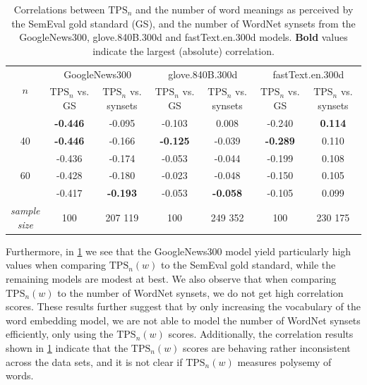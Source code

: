 \begin{table}[H]
    \centering
    \begin{tabular}{ccccccc}
    \toprule
    \multicolumn{1}{c}{\multirow{2}{*}{$n$}} & \multicolumn{2}{c}{GoogleNews300}    & \multicolumn{2}{c}{glove.840B.300d}              & \multicolumn{2}{c}{fastText.en.300d}             \\
    \cmidrule(l){2-7} 
    \multicolumn{1}{c}{}                   & \makecell[tc]{$\text{TPS}_n$ vs.\\GS} & \makecell[tc]{$\text{TPS}_n$ vs.\\synsets} & \makecell[tc]{$\text{TPS}_n$ vs.\\GS} & \makecell[tc]{$\text{TPS}_n$ vs.\\synsets} & \makecell[tc]{$\text{TPS}_n$ vs.\\GS} & \makecell[tc]{$\text{TPS}_n$ vs.\\synsets} \\ \midrule
    \trcolor 10           & \textbf{-0.446}  & -0.095       & -0.103  & 0.008        & -0.240  & \textbf{0.114}        \\
    40           & \textbf{-0.446}  & -0.166       & \textbf{-0.125}  & -0.039       & \textbf{-0.289}  & 0.110        \\
    \trcolor 50           & -0.436  & -0.174       & -0.053  & -0.044       & -0.199  & 0.108        \\
    60           & -0.428  & -0.180       & -0.023  & -0.048       & -0.150  & 0.105        \\
    \trcolor 100          & -0.417  & \textbf{-0.193}       & -0.053  & \textbf{-0.058}       & -0.105  & 0.099        \\
    \midrule
    \makecell[tc]{\textit{sample}\\\textit{size}} & 100 & 207 119 & 100 & 249 352 & 100 & 230 175 \\
    \bottomrule
    \end{tabular}
    \caption{Correlations between $\text{TPS}_n$ and the number of word meanings as perceived by the SemEval gold standard (GS), and the number of WordNet synsets from the GoogleNews300, glove.840B.300d and fastText.en.300d models. \textbf{Bold} values indicate the largest (absolute) correlation.}
    \label{table:tps-n-correlation-external-word-embeddings}
\end{table}
Furthermore, in \cref{table:tps-n-correlation-external-word-embeddings} we see that the GoogleNews300 model yield particularly high values when comparing $\text{TPS}_n(w)$ to the SemEval gold standard, while the remaining models are modest at best. We also observe that when comparing $\text{TPS}_n(w)$ to the number of WordNet synsets, we do not get high correlation scores. These results further suggest that by only increasing the vocabulary of the word embedding model, we are not able to model the number of WordNet synsets efficiently, only using the $\text{TPS}_n(w)$ scores. Additionally, the correlation results shown in \cref{table:tps-n-correlation-external-word-embeddings} indicate that the $\text{TPS}_n(w)$ scores are behaving rather inconsistent across the data sets, and it is not clear if $\text{TPS}_n(w)$ measures polysemy of words.

